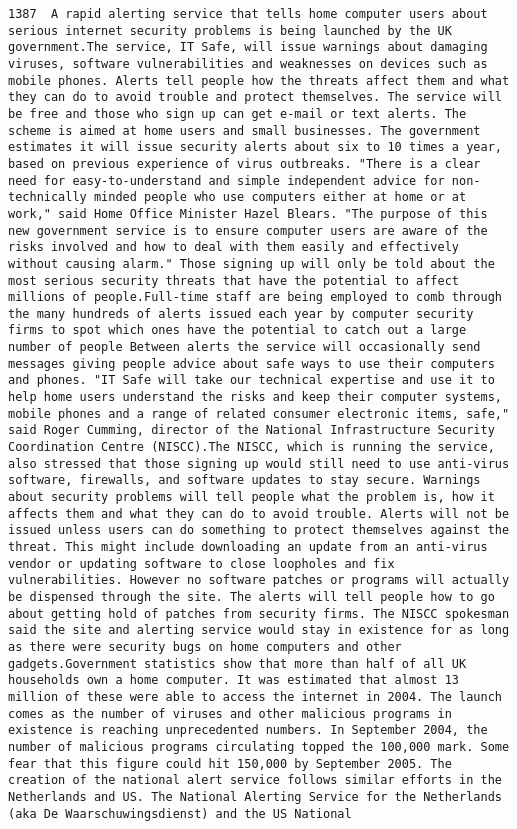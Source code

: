 \documentclass[11pt]{article}
\begin{document}
\begin{Verbatim}[commandchars=\\\{\}]
         1387  A rapid alerting service that tells home computer users about serious internet security problems is being launched by the UK government.The service, IT Safe, will issue warnings about damaging viruses, software vulnerabilities and weaknesses on devices such as mobile phones. Alerts tell people how the threats affect them and what they can do to avoid trouble and protect themselves. The service will be free and those who sign up can get e-mail or text alerts. The scheme is aimed at home users and small businesses. The government estimates it will issue security alerts about six to 10 times a year, based on previous experience of virus outbreaks. "There is a clear need for easy-to-understand and simple independent advice for non-technically minded people who use computers either at home or at work," said Home Office Minister Hazel Blears. "The purpose of this new government service is to ensure computer users are aware of the risks involved and how to deal with them easily and effectively without causing alarm." Those signing up will only be told about the most serious security threats that have the potential to affect millions of people.Full-time staff are being employed to comb through the many hundreds of alerts issued each year by computer security firms to spot which ones have the potential to catch out a large number of people Between alerts the service will occasionally send messages giving people advice about safe ways to use their computers and phones. "IT Safe will take our technical expertise and use it to help home users understand the risks and keep their computer systems, mobile phones and a range of related consumer electronic items, safe," said Roger Cumming, director of the National Infrastructure Security Coordination Centre (NISCC).The NISCC, which is running the service, also stressed that those signing up would still need to use anti-virus software, firewalls, and software updates to stay secure. Warnings about security problems will tell people what the problem is, how it affects them and what they can do to avoid trouble. Alerts will not be issued unless users can do something to protect themselves against the threat. This might include downloading an update from an anti-virus vendor or updating software to close loopholes and fix vulnerabilities. However no software patches or programs will actually be dispensed through the site. The alerts will tell people how to go about getting hold of patches from security firms. The NISCC spokesman said the site and alerting service would stay in existence for as long as there were security bugs on home computers and other gadgets.Government statistics show that more than half of all UK households own a home computer. It was estimated that almost 13 million of these were able to access the internet in 2004. The launch comes as the number of viruses and other malicious programs in existence is reaching unprecedented numbers. In September 2004, the number of malicious programs circulating topped the 100,000 mark. Some fear that this figure could hit 150,000 by September 2005. The creation of the national alert service follows similar efforts in the Netherlands and US. The National Alerting Service for the Netherlands (aka De Waarschuwingsdienst) and the US National 
\end{Verbatim}
\end{document}
